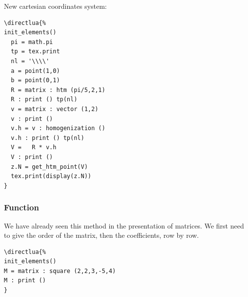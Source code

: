\vspace{.5 em}

New  cartesian coordinates system:

\vspace{.5 em}
\begin{minipage}{.5\textwidth}
\begin{verbatim}
\directlua{%
init_elements()
  pi = math.pi
  tp = tex.print
  nl = '\\\\'
  a = point(1,0)
  b = point(0,1)
  R = matrix : htm (pi/5,2,1)
  R : print () tp(nl)
  v = matrix : vector (1,2)
  v : print ()
  v.h = v : homogenization ()
  v.h : print () tp(nl)
  V =   R * v.h
  V : print ()
  z.N = get_htm_point(V)
  tex.print(display(z.N))
}
\end{verbatim}
\end{minipage}
\begin{minipage}{.5\textwidth}
\end{minipage}




\subsubsection{Function } %
\label{ssub:method_square}

We have already seen this method in the presentation of matrices. We first need to give the order of the matrix, then the coefficients, row by row.

\begin{minipage}{.5\textwidth}
\begin{Verbatim}
\directlua{%
init_elements()
M = matrix : square (2,2,3,-5,4)
M : print ()
}
\end{Verbatim}
\end{minipage}
\begin{minipage}{.5\textwidth}
\end{minipage}

